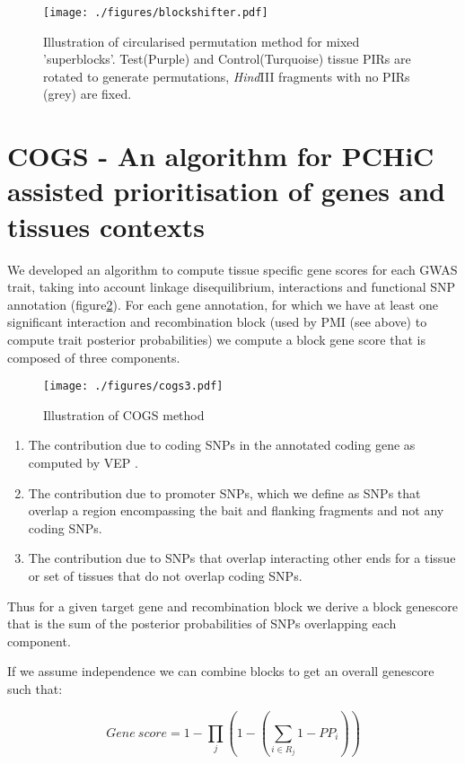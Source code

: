\documentclass[a4paper,11pt]{book}
\begin{document}
\begin{figure}[h]

\texttt{[image: ./figures/blockshifter.pdf]}
\caption{Illustration of circularised permutation method for mixed 'superblocks'. Test(Purple) and Control(Turquoise) tissue PIRs are rotated to generate permutations, \textit{Hind}III fragments with no PIRs (grey) are fixed.}
\label{fig:blockshifter}
\centering
\end{figure}

\section{COGS - An algorithm for PCHiC assisted prioritisation of genes and tissues contexts}
We developed an algorithm to compute tissue specific gene scores for each GWAS trait, taking into account linkage disequilibrium, interactions and functional SNP annotation (figure\ref{fig:cogs}). For each gene annotation, for which we have at least one significant interaction and recombination block (used by PMI (see above) to compute trait posterior probabilities)  we compute a block gene score that is composed of three components.

\begin{figure}[h]
\texttt{[image: ./figures/cogs3.pdf]}
\caption{Illustration of COGS method}
\label{fig:cogs}
\centering
\end{figure}

\begin{enumerate}
\item The contribution due to coding SNPs in the annotated coding gene as computed by VEP .
\item The contribution due to promoter SNPs, which we define as SNPs that overlap a region encompassing the bait and flanking  fragments and not any coding SNPs.
\item The contribution due to SNPs that overlap interacting other ends for a tissue or set of tissues that do not overlap coding SNPs. 
\end{enumerate}

Thus for a given target gene and recombination block we derive a block genescore that is the sum of the posterior probabilities of SNPs overlapping each component.

If we assume independence we can combine blocks to get an overall genescore such that:

\begin{equation}
  Gene\ score = 1- \prod_j  \left(1-\left(\sum_{i \in R_j} 1-PP_i \right) \right)
\end{equation}
\end{document}
